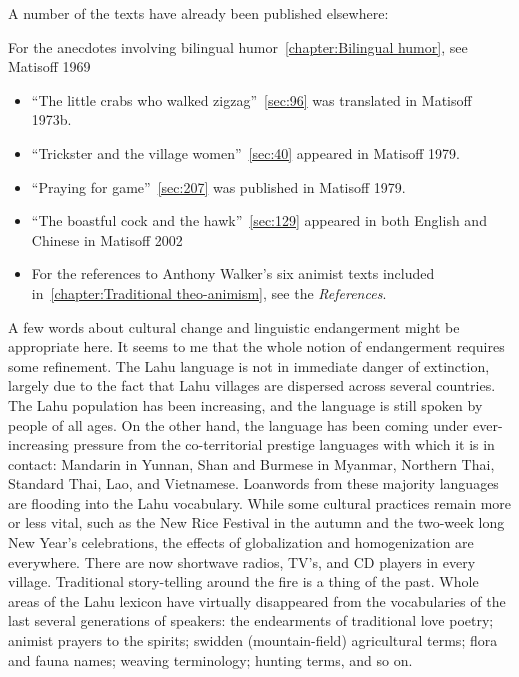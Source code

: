 A number of the texts have already been published elsewhere:

For the anecdotes involving bilingual humor~\ref{chapter:Bilingual humor}, see Matisoff 1969

\begin{itemize}
\item ``The little crabs who walked zigzag''~\ref{sec:96} was
  translated in Matisoff 1973b.

\item ``Trickster and the village women''~\ref{sec:40} appeared in
  Matisoff 1979.

\item ``Praying for game''~\ref{sec:207} was published in Matisoff
  1979.

\item ``The boastful cock and the hawk''~\ref{sec:129} appeared in
  both English and Chinese in Matisoff 2002

\item For the references to Anthony Walker's six animist texts
  included in~\ref{chapter:Traditional theo-animism}, see the
  \emph{References}.

\end{itemize}

A few words about cultural change and linguistic endangerment might be
appropriate here. It seems to me that the whole notion of endangerment
requires some refinement. The Lahu language is not in immediate
danger of extinction, largely due to the fact that Lahu villages are
dispersed across several countries. The Lahu population has been
increasing, and the language is still spoken by people of all ages. On
the other hand, the language has been coming under ever-increasing
pressure from the co-territorial prestige languages with which it is in
contact: Mandarin in Yunnan, Shan and Burmese in Myanmar, Northern Thai,
Standard Thai, Lao, and Vietnamese. Loanwords from these majority
languages are flooding into the Lahu vocabulary. While some cultural
practices remain more or less vital, such as the New Rice Festival in
the autumn and the two-week long New Year's celebrations, the effects of
globalization and homogenization are everywhere. There are now shortwave
radios, TV's, and CD players in every village. Traditional story-telling
around the fire is a thing of the past. Whole areas of the Lahu lexicon
have virtually disappeared from the vocabularies of the last several
generations of speakers: the endearments of traditional love poetry;
animist prayers to the spirits; swidden (mountain-field) agricultural
terms; flora and fauna names; weaving terminology; hunting terms, and so
on.


